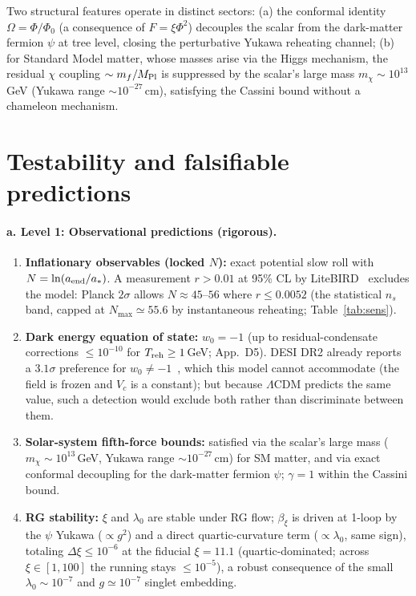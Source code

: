 \documentclass[pdflatex,sn-mathphys-num]{sn-jnl}
\newcommand{\MP}{M_{\rm Pl}}
\newcommand{\PhiV}{\Phi_0}
\theoremstyle{thmstyleone}
\begin{document}
Two structural features operate in distinct sectors: (a) the conformal identity $\Omega=\Phi/\PhiV$ (a consequence of $F=\xi\Phi^2$) decouples the scalar from the dark-matter fermion $\psi$ at tree level, closing the perturbative Yukawa reheating channel; (b) for Standard Model matter, whose masses arise via the Higgs mechanism, the residual $\chi$ coupling $\sim m_f/\MP$ is suppressed by the scalar's large mass $m_\chi\sim10^{13}\,$GeV (Yukawa range $\sim10^{-27}\,$cm), satisfying the Cassini bound without a chameleon mechanism.

\section{Testability and falsifiable predictions}

\paragraph{a. Level 1: Observational predictions (rigorous).}
\begin{enumerate}
\item \textbf{Inflationary observables (locked $N$):} exact potential slow roll with $N=\ln(a_{\rm end}/a_*)$. A measurement $r>0.01$ at 95\% CL by LiteBIRD~\cite{LiteBIRD2023} excludes the model: Planck $2\sigma$ allows $N\approx45$--$56$ where $r\leq0.0052$ (the statistical $n_s$ band, capped at $N_{\max}\simeq55.6$ by instantaneous reheating; Table~\ref{tab:sens}).
\item \textbf{Dark energy equation of state:} $w_0=-1$ (up to residual-condensate corrections $\leq10^{-10}$ for $T_{\rm reh}\geq1\,$GeV; App.~D5). DESI DR2 already reports a $3.1\sigma$ preference for $w_0\neq-1$~\cite{DESI2025}, which this model cannot accommodate (the field is frozen and $V_c$ is a constant); but because $\Lambda$CDM predicts the same value, such a detection would exclude both rather than discriminate between them.
\item \textbf{Solar-system fifth-force bounds:} satisfied via the scalar's large mass ($m_\chi\sim10^{13}\,$GeV, Yukawa range $\sim10^{-27}\,$cm) for SM matter, and via exact conformal decoupling for the dark-matter fermion $\psi$; $\gamma=1$ within the Cassini bound.
\item \textbf{RG stability:} $\xi$ and $\lambda_0$ are stable under RG flow; $\beta_\xi$ is driven at 1-loop by the $\psi$ Yukawa ($\propto g^2$) and a direct quartic-curvature term ($\propto\lambda_0$, same sign), totaling $\Delta\xi\leq10^{-6}$ at the fiducial $\xi=11.1$ (quartic-dominated; across $\xi\in[1,100]$ the running stays $\leq10^{-5}$), a robust consequence of the small $\lambda_0\sim10^{-7}$ and $g\simeq10^{-7}$ singlet embedding.
\end{enumerate}
\end{document}
